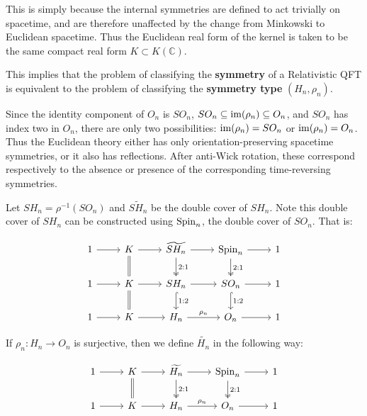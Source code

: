 \documentclass[a4paper,11pt]{article}
\begin{document}
This is simply because the internal symmetries are defined to act trivially on spacetime, and are therefore unaffected by the change from Minkowski to Euclidean spacetime. Thus the Euclidean real form of the kernel is taken to be the same compact real form $K\subset K(\mathbb C)$.
 
\begin{remark}
    This implies that the problem of classifying the {\bf symmetry} of a Relativistic QFT is equivalent to the problem of classifying the {\bf symmetry type} $(H_n, \rho_n)$.
\end{remark}

\begin{remark}
Since the identity component of $O_n$ is $SO_n$, $SO_n \subseteq {\rm im}(\rho_n) \subseteq O_n$, and $SO_n$ has index two in $O_n$, there are only two possibilities: ${\rm im}(\rho_n) = SO_n$ or ${\rm im}(\rho_n) = O_n$. Thus the Euclidean theory either has only orientation-preserving
spacetime symmetries, or it also has reflections. After anti-Wick rotation, these correspond respectively to the absence or presence of the corresponding time-reversing symmetries.
\end{remark}

Let $SH_n = \rho^{-1}(SO_n)$ and $\widetilde{SH_n}$ be the double cover of $SH_n$. Note this double cover of $SH_n$ can be constructed using ${\rm Spin}_n$, the double cover of $SO_n$. That is:

\[
\begin{tikzcd}
1 \arrow[r] & K \arrow[r] \arrow[d, equal] &
\widetilde{SH_n} \arrow[r] \arrow[d, two heads, "2:1"] &
{\rm Spin}_n \arrow[r] \arrow[d, two heads, "2:1"] &  1\\
1 \arrow[r] & K \arrow[r] \arrow[d, equal] &
SH_n \arrow[r] \arrow[d, hook, "1:2"] &
SO_n \arrow[r] \arrow[d, hook, "1:2"] & 1 \\
1 \arrow[r] & K \arrow[r] &
H_n \arrow[r, "\rho_n"]  &
O_n \arrow[r]  & 1
\end{tikzcd}
\]

If $\rho_n: H_n \to O_n$ is surjective, then we define $\widetilde{H_n}$ in the following way:

\[
\begin{tikzcd}
1 \arrow[r] & K \arrow[r] \arrow[d, equal] &
\widetilde{H_n} \arrow[r] \arrow[d, two heads, "2:1"] &
{\rm Spin}_n \arrow[r] \arrow[d, two heads, "2:1"] &  1\\
1 \arrow[r] & K \arrow[r] &
H_n \arrow[r, "\rho_n"]  &
O_n \arrow[r]  & 1
\end{tikzcd}
\]
\end{document}
